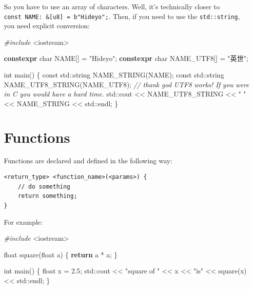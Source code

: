 \documentclass[
]{book}
\newenvironment{Shaded}{\begin{snugshade}}{\end{snugshade}}
\newcommand{\AttributeTok}[1]{\textcolor[rgb]{0.77,0.63,0.00}{#1}}
\newcommand{\BuiltInTok}[1]{#1}
\newcommand{\CommentTok}[1]{\textcolor[rgb]{0.56,0.35,0.01}{\textit{#1}}}
\newcommand{\ControlFlowTok}[1]{\textcolor[rgb]{0.13,0.29,0.53}{\textbf{#1}}}
\newcommand{\DataTypeTok}[1]{\textcolor[rgb]{0.13,0.29,0.53}{#1}}
\newcommand{\FloatTok}[1]{\textcolor[rgb]{0.00,0.00,0.81}{#1}}
\newcommand{\ImportTok}[1]{#1}
\newcommand{\KeywordTok}[1]{\textcolor[rgb]{0.13,0.29,0.53}{\textbf{#1}}}
\newcommand{\NormalTok}[1]{#1}
\newcommand{\PreprocessorTok}[1]{\textcolor[rgb]{0.56,0.35,0.01}{\textit{#1}}}
\newcommand{\StringTok}[1]{\textcolor[rgb]{0.31,0.60,0.02}{#1}}
\begin{document}
So you have to use an array of characters. Well, it's technically closer to \texttt{const\ NAME:\ \&{[}u8{]}\ =\ b"Hideyo";}. Then, if you need to use the \texttt{std::string}, you need explicit conversion:

\begin{Shaded}
\begin{Highlighting}[]
\PreprocessorTok{\#include }\ImportTok{\textless{}iostream\textgreater{}}

\KeywordTok{constexpr} \DataTypeTok{char}\NormalTok{ NAME[] = }\StringTok{"Hideyo"}\NormalTok{;}
\KeywordTok{constexpr} \DataTypeTok{char}\NormalTok{ NAME\_UTF8[] = }\StringTok{"英世"}\NormalTok{;}

\DataTypeTok{int}\NormalTok{ main()}
\NormalTok{\{}
    \AttributeTok{const} \BuiltInTok{std::}\NormalTok{string NAME\_STRING(NAME);}
    \AttributeTok{const} \BuiltInTok{std::}\NormalTok{string NAME\_UTF8\_STRING(NAME\_UTF8);}
    \CommentTok{// thank god UTF8 works! If you were in C you would have a hard time.}
    \BuiltInTok{std::}\NormalTok{cout \textless{}\textless{} NAME\_UTF8\_STRING \textless{}\textless{} }\StringTok{" "}\NormalTok{ \textless{}\textless{} NAME\_STRING \textless{}\textless{} }\BuiltInTok{std::}\NormalTok{endl;}
\NormalTok{\}}
\end{Highlighting}
\end{Shaded}

\hypertarget{functions}{%
\section{Functions}\label{functions}}

Functions are declared and defined in the following way:

\begin{verbatim}
<return_type> <function_name>(<params>) {
    // do something
    return something;
}
\end{verbatim}

For example:

\begin{Shaded}
\begin{Highlighting}[]
\PreprocessorTok{\#include }\ImportTok{\textless{}iostream\textgreater{}}

\DataTypeTok{float}\NormalTok{ square(}\DataTypeTok{float}\NormalTok{ a)}
\NormalTok{\{}
    \ControlFlowTok{return}\NormalTok{ a * a;}
\NormalTok{\}}

\DataTypeTok{int}\NormalTok{ main()}
\NormalTok{\{}
    \DataTypeTok{float}\NormalTok{ x = }\FloatTok{2.5}\NormalTok{;}
    \BuiltInTok{std::}\NormalTok{cout \textless{}\textless{} }\StringTok{"square of "}\NormalTok{ \textless{}\textless{} x \textless{}\textless{} }\StringTok{"is"}\NormalTok{ \textless{}\textless{} square(x) \textless{}\textless{} }\BuiltInTok{std::}\NormalTok{endl;}
\NormalTok{\}}
\end{Highlighting}
\end{Shaded}
\end{document}
